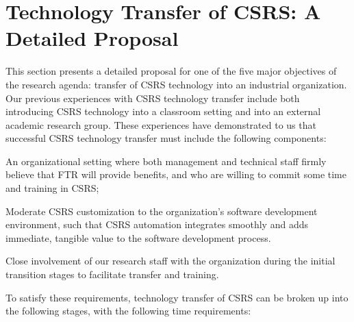 
\section{Technology Transfer of CSRS: A Detailed Proposal}
\label{sec:tech-transfer}

This section presents a detailed proposal for one of the five major
objectives of the research agenda: transfer of CSRS technology into an
industrial organization.  Our previous experiences with CSRS technology
transfer include both introducing CSRS technology into a classroom setting
and into an external academic research group.  These experiences have
demonstrated to us that successful CSRS technology transfer must include
the following components:

\begin{itemizenoindent}
  
\item An organizational setting where both management and technical staff
  firmly believe that FTR will provide benefits, and who are willing to
  commit some time and training in CSRS;
  
\item Moderate CSRS customization to the organization's software
  development environment, such that CSRS automation integrates smoothly
  and adds immediate, tangible value to the software development process. 
  
\item Close involvement of our research staff with the organization
  during the initial transition stages to facilitate transfer and training.

\end{itemizenoindent}

To satisfy these requirements, technology transfer of CSRS can be
broken up into the following stages, with the following time requirements:

